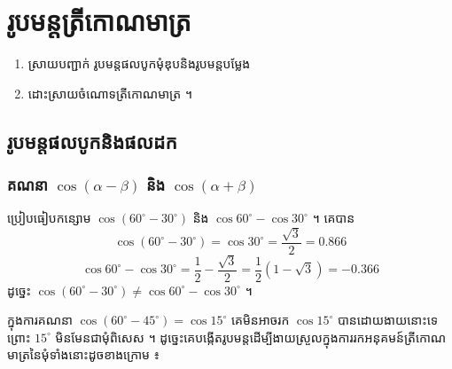 \chapter{រូបមន្តត្រីកោណមាត្រ}

\begin{objBox}[វត្ថុបំណង]
\begin{enumerate}[1]
  \item ស្រាយបញ្ជាក់ រូបមន្តផលបូកមុំឌុបនិងរូបមន្តបម្លែង
  \item ដោះស្រាយចំណោទត្រីកោណមាត្រ ។
\end{enumerate}
\end{objBox}

\section{រូបមន្តផលបូកនិងផលដក}

\subsection{គណនា \texorpdfstring{$\cos(\alpha - \beta)$}{cos(α − β)} និង \texorpdfstring{$\cos(\alpha + \beta)$}{cos(α + β)}}

\begin{example}[ឧទាហរណ៍ ១]
ប្រៀបធៀបកន្សោម $\cos(60^\circ - 30^\circ)$ និង $\cos 60^\circ - \cos 30^\circ$ ។ គេបាន
\[ \cos(60^\circ - 30^\circ) = \cos 30^\circ = \frac{\sqrt{3}}{2} = 0.866 \]
\[ \cos 60^\circ - \cos 30^\circ = \frac{1}{2} - \frac{\sqrt{3}}{2} = \frac{1}{2}(1 - \sqrt{3}) = -0.366 \]
ដូច្នេះ $\cos(60^\circ - 30^\circ) \ne \cos 60^\circ - \cos 30^\circ$ ។
\end{example}

ក្នុងការគណនា $\cos(60^\circ - 45^\circ) = \cos 15^\circ$ គេមិនអាចរក $\cos 15^\circ$ បានដោយងាយនោះទេ ព្រោះ $15^\circ$ មិនមែនជាមុំពិសេស ។ ដូច្នេះគេបង្កើតរូបមន្តដើម្បីងាយស្រួលក្នុងការរកអនុគមន៍ត្រីកោណមាត្រនៃមុំទាំងនោះដូចខាងក្រោម ៖

